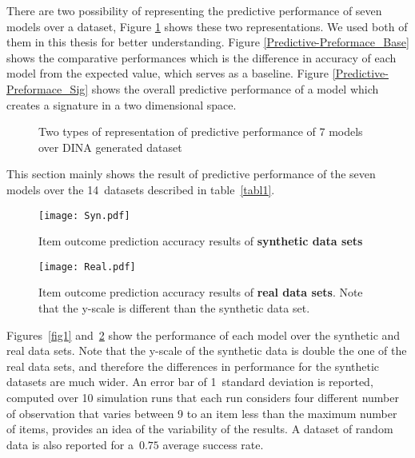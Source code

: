 There are two possibility of representing the predictive performance of seven models over a dataset, Figure \ref{Fig:Predictive-Preformace_rep} shows these two representations. We used both of them in this thesis for better understanding. Figure \ref{Predictive-Preformace_Base} shows the comparative performances which is the difference in accuracy of each model from the expected value, which serves as a baseline. Figure \ref{Predictive-Preformace_Sig} shows the overall predictive performance of a model which creates a signature in a two dimensional space.

\begin{figure}[ht]
\centering

\quad
\caption{Two types of representation of predictive performance of 7 models over DINA generated dataset}
\label{Fig:Predictive-Preformace_rep}
\end{figure}

This section mainly shows the result of predictive performance of the seven models over the 14~datasets described in table~\ref{tabl1}. 

\begin{figure}
\centering
\texttt{[image: Syn.pdf]}
\caption{Item outcome prediction accuracy results of {\textbf{synthetic data sets}}}
\label{fig1}

{\texttt{[image: Real.pdf]}}
\caption{Item outcome prediction accuracy results of {\textbf{real data sets}}.  Note that the y-scale is different than the synthetic data set.}
\label{fig2}
\end{figure}


Figures~\ref{fig1} and~\ref{fig2} show the performance of each model over the synthetic and real data sets. Note that the y-scale of the synthetic data is double the one of the real data sets, and therefore the differences in performance for the synthetic datasets are much wider.  An error bar of 1~standard deviation is reported, computed over 10 simulation runs that each run considers four different number of observation that varies between 9 to an item less than the maximum number of items, provides an idea of the variability of the results. A dataset of random data is also reported for a~$0.75$ average success rate.

